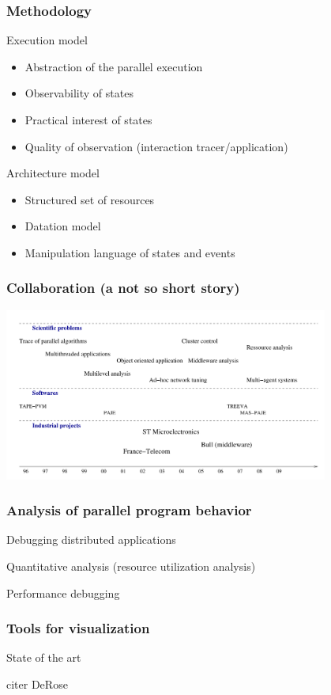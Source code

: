 \begin{frame}
\frametitle{Methodology}
\begin{block}{Execution model}
\begin{itemize}
\item Abstraction of the parallel execution
\item Observability of states
\item Practical interest of states
\item Quality of observation (interaction tracer/application)
\end{itemize}
\end{block}
\begin{block}{Architecture model}
\begin{itemize}
\item Structured set of resources
\item Datation model
\item Manipulation language of states and events
\end{itemize}
\end{block}
\end{frame}
\begin{frame}

\frametitle{Collaboration (a not so short story)}
\includegraphics[width=0.8\textwidth]{img/collaboration.pdf}
\end{frame}


\begin{frame}
\frametitle{Analysis of parallel program behavior}
\begin{description}
\item Debugging distributed applications
\item Quantitative analysis (resource utilization analysis) 
\item Performance debugging
\end{description}
\end{frame}

\begin{frame}
\frametitle{Tools for visualization}
State of the art

citer DeRose
\end{frame}

